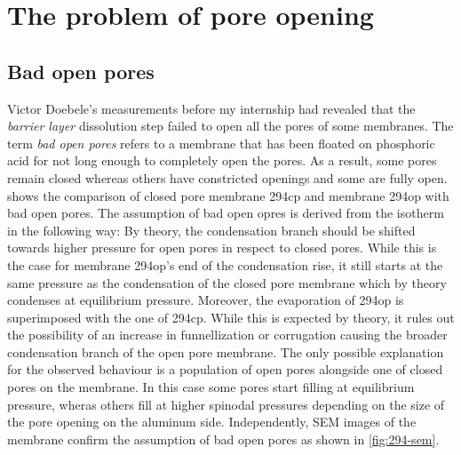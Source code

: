 \documentclass[../thesis.tex]{subfiles}
\begin{document}
  \section{The problem of pore opening}
  \label{sec:opening-problem}


      \subsection{Bad open pores}
      \label{subsec:bad-open-pores}

        

        Victor Doebele's measurements before my internship had revealed that the \textit{barrier layer} dissolution step failed to open all the pores of some membranes. The term \textit{bad open pores} refers to a membrane that has been floated on phosphoric acid for not long enough to completely open the pores. As a result, some pores remain closed whereas others have constricted openings and some are fully open.  shows the comparison of closed pore membrane 294cp and membrane 294op with bad open pores. The assumption of bad open opres is derived from the isotherm in the following way: By theory, the condensation branch should be shifted towards higher pressure for open pores in respect to closed pores. While this is the case for membrane 294op's end of the condensation rise, it still starts at the same pressure as the condensation of the closed pore membrane which by theory condenses at equilibrium pressure. Moreover, the evaporation of 294op is superimposed with the one of 294cp. While this is expected by theory, it rules out the possibility of an increase in funnellization or corrugation causing the broader condensation branch of the open pore membrane. The only possible explanation for the observed behaviour is a population of open pores alongside one of closed pores on the membrane. In this case some pores start filling at equilibrium pressure, wheras others fill at higher spinodal pressures depending on the size of the pore opening on the aluminum side. Independently, SEM images of the membrane confirm the assumption of bad open pores as shown in \cref{fig:294-sem}.
\end{document}
